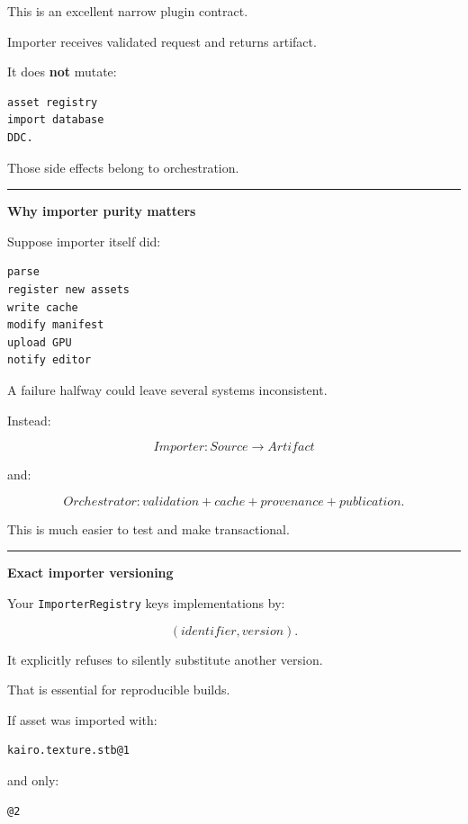 This is an excellent narrow plugin contract.

Importer receives validated request and returns artifact.

It does \textbf{not} mutate:

\begin{verbatim}
asset registry
import database
DDC.
\end{verbatim}

Those side effects belong to orchestration.

\begin{center}\rule{0.5\linewidth}{0.5pt}\end{center}

\textbf{Why importer purity matters}

Suppose importer itself did:

\begin{verbatim}
parse
register new assets
write cache
modify manifest
upload GPU
notify editor
\end{verbatim}

A failure halfway could leave several systems inconsistent.

Instead:

\[
Importer:
Source\rightarrow Artifact
\]

and:

\[
Orchestrator:
validation + cache + provenance + publication.
\]

This is much easier to test and make transactional.

\begin{center}\rule{0.5\linewidth}{0.5pt}\end{center}

\textbf{Exact importer versioning}

Your \texttt{ImporterRegistry} keys implementations by:

\[
(identifier,version).
\]

It explicitly refuses to silently substitute another version.

That is essential for reproducible builds.

If asset was imported with:

\begin{verbatim}
kairo.texture.stb@1
\end{verbatim}

and only:

\begin{verbatim}
@2
\end{verbatim}

